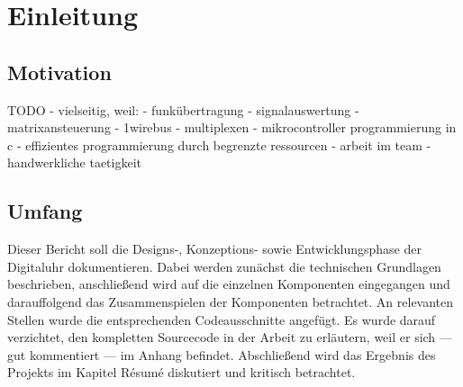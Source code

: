 \section{Einleitung}
\subsection{Motivation}
TODO
- vielseitig, weil:
- funkübertragung
- signalauswertung
- matrixansteuerung
- 1wirebus
- multiplexen
- mikrocontroller programmierung in c
- effizientes programmierung durch begrenzte ressourcen
- arbeit im team
- handwerkliche taetigkeit

\subsection{Umfang}
Dieser Bericht soll die Designs-, Konzeptions- sowie Entwicklungsphase der Digitaluhr dokumentieren. Dabei werden zunächst die technischen Grundlagen beschrieben, anschließend wird auf die einzelnen Komponenten eingegangen und darauffolgend das Zusammenspielen der Komponenten betrachtet. An relevanten Stellen wurde die entsprechenden Codeausschnitte angefügt. Es wurde darauf verzichtet, den kompletten Sourcecode in der Arbeit zu erläutern, weil er sich --- gut kommentiert --- im Anhang befindet. Abschließend wird das Ergebnis des Projekts im Kapitel Résumé diskutiert und kritisch betrachtet.